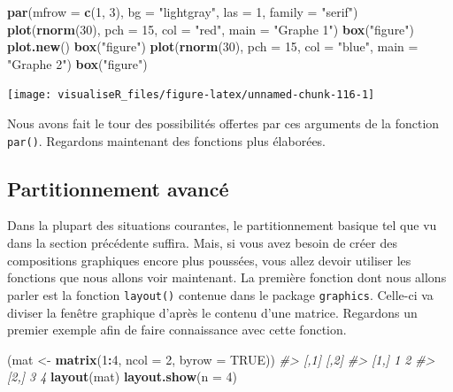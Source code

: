 \documentclass[]{article}
\newenvironment{Shaded}{\begin{snugshade}}{\end{snugshade}}
\newcommand{\CommentTok}[1]{\textcolor[rgb]{0.56,0.35,0.01}{\textit{#1}}}
\newcommand{\DataTypeTok}[1]{\textcolor[rgb]{0.13,0.29,0.53}{#1}}
\newcommand{\DecValTok}[1]{\textcolor[rgb]{0.00,0.00,0.81}{#1}}
\newcommand{\KeywordTok}[1]{\textcolor[rgb]{0.13,0.29,0.53}{\textbf{#1}}}
\newcommand{\NormalTok}[1]{#1}
\newcommand{\OperatorTok}[1]{\textcolor[rgb]{0.81,0.36,0.00}{\textbf{#1}}}
\newcommand{\OtherTok}[1]{\textcolor[rgb]{0.56,0.35,0.01}{#1}}
\newcommand{\StringTok}[1]{\textcolor[rgb]{0.31,0.60,0.02}{#1}}
\begin{document}
\begin{Shaded}
\begin{Highlighting}[]
\KeywordTok{par}\NormalTok{(}\DataTypeTok{mfrow =} \KeywordTok{c}\NormalTok{(}\DecValTok{1}\NormalTok{, }\DecValTok{3}\NormalTok{), }\DataTypeTok{bg =} \StringTok{"lightgray"}\NormalTok{, }\DataTypeTok{las =} \DecValTok{1}\NormalTok{, }\DataTypeTok{family =} \StringTok{"serif"}\NormalTok{)}
\KeywordTok{plot}\NormalTok{(}\KeywordTok{rnorm}\NormalTok{(}\DecValTok{30}\NormalTok{), }\DataTypeTok{pch =} \DecValTok{15}\NormalTok{, }\DataTypeTok{col =} \StringTok{"red"}\NormalTok{, }\DataTypeTok{main =} \StringTok{"Graphe 1"}\NormalTok{)}
\KeywordTok{box}\NormalTok{(}\StringTok{"figure"}\NormalTok{)}
\KeywordTok{plot.new}\NormalTok{()}
\KeywordTok{box}\NormalTok{(}\StringTok{"figure"}\NormalTok{)}
\KeywordTok{plot}\NormalTok{(}\KeywordTok{rnorm}\NormalTok{(}\DecValTok{30}\NormalTok{), }\DataTypeTok{pch =} \DecValTok{15}\NormalTok{, }\DataTypeTok{col =} \StringTok{"blue"}\NormalTok{, }\DataTypeTok{main =} \StringTok{"Graphe 2"}\NormalTok{)}
\KeywordTok{box}\NormalTok{(}\StringTok{"figure"}\NormalTok{)}
\end{Highlighting}
\end{Shaded}

\begin{center}\texttt{[image: visualiseR\_files/figure-latex/unnamed-chunk-116-1]} \end{center}

Nous avons fait le tour des possibilités offertes par ces arguments de la fonction \texttt{par()}. Regardons maintenant des fonctions plus élaborées.

\hypertarget{partitionnement-avancuxe9}{%
\subsection{Partitionnement avancé}\label{partitionnement-avancuxe9}}

Dans la plupart des situations courantes, le partitionnement basique tel que vu
dans la section précédente suffira. Mais, si vous avez besoin de créer des
compositions graphiques encore plus poussées, vous allez devoir utiliser les
fonctions que nous allons voir maintenant. La première fonction dont nous allons
parler est la fonction \texttt{layout()} contenue dans le package \texttt{graphics}. Celle-ci
va diviser la fenêtre graphique d'après le contenu d'une matrice. Regardons un
premier exemple afin de faire connaissance avec cette fonction.

\begin{Shaded}
\begin{Highlighting}[]
\NormalTok{(mat <-}\StringTok{ }\KeywordTok{matrix}\NormalTok{(}\DecValTok{1}\OperatorTok{:}\DecValTok{4}\NormalTok{, }\DataTypeTok{ncol =} \DecValTok{2}\NormalTok{, }\DataTypeTok{byrow =} \OtherTok{TRUE}\NormalTok{))}
\CommentTok{#>      [,1] [,2]}
\CommentTok{#> [1,]    1    2}
\CommentTok{#> [2,]    3    4}
\KeywordTok{layout}\NormalTok{(mat)}
\KeywordTok{layout.show}\NormalTok{(}\DataTypeTok{n =} \DecValTok{4}\NormalTok{)}
\end{Highlighting}
\end{Shaded}
\end{document}
